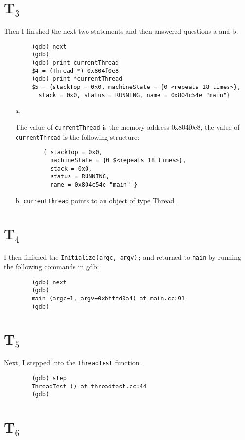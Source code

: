 \documentclass[letterpaper, 10pt]{article}
\begin{document}
	\section*{T$_3$}

	Then I finished the next two statements and then answered questions a and b.

	\begin{verbatim}
		(gdb) next
		(gdb)
		(gdb) print currentThread
		$4 = (Thread *) 0x804f0e8
		(gdb) print *currentThread
		$5 = {stackTop = 0x0, machineState = {0 <repeats 18 times>},
		  stack = 0x0, status = RUNNING, name = 0x804c54e "main"}
	\end{verbatim}

	\begin{itemize}
		\item[a.]{The value of {\tt currentThread} is the memory address 0x804f0e8, the value of {\tt *currentThread} is the following structure:
		\begin{verbatim}
		{ stackTop = 0x0,
		  machineState = {0 $<repeats 18 times>},
		  stack = 0x0,
		  status = RUNNING,
		  name = 0x804c54e "main" }
		\end{verbatim}}

		\item[b.]{{\tt currentThread} points to an object of type Thread.}
	\end{itemize}

	\section*{T$_4$}

	I then finished the {\tt Initialize(argc, argv);} and returned to {\tt main} by running the following commands in gdb:

	\begin{verbatim}
		(gdb) next
		(gdb)
		main (argc=1, argv=0xbfffd0a4) at main.cc:91
		(gdb)
	\end{verbatim}

	\section*{T$_5$}

	Next, I stepped into the {\tt ThreadTest} function.

	\begin{verbatim}
		(gdb) step
		ThreadTest () at threadtest.cc:44
		(gdb)
	\end{verbatim}

	\section*{T$_6$}
\end{document}
